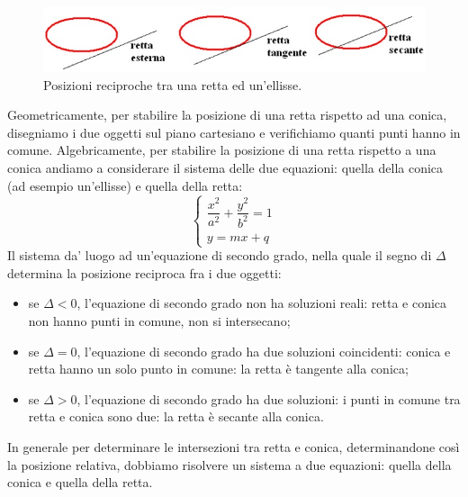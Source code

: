 \begin{figure}[htbp]
  \centering
  \includegraphics[width=\textwidth]{img/rettaconica.jpg}
  \caption{Posizioni reciproche tra una retta ed un'ellisse.}%
\end{figure}
Geometricamente, per stabilire la posizione di una retta rispetto ad una 
conica, disegniamo i due oggetti sul piano cartesiano e verifichiamo quanti 
punti hanno in comune. Algebricamente, per stabilire la posizione di una 
retta rispetto a una conica andiamo a considerare il sistema delle due 
equazioni: quella della conica (ad esempio un'ellisse) e quella della 
retta:
\[\begin{cases}  \dfrac{x^{2}}{a^{2}}+\dfrac{y^{2}}{b^{2}}=1   \\ y=mx+q  
\end{cases}\]
Il sistema da' luogo ad un'equazione di secondo grado, nella quale il 
segno di $\Delta$ determina la posizione reciproca fra i due oggetti:

\begin{itemize} [noitemsep]
  \item se $\Delta<0$, l'equazione di secondo grado non ha soluzioni 
reali: retta e conica non hanno punti in comune, non si intersecano;
  \item se $\Delta=0$, l'equazione di secondo grado ha due soluzioni coincidenti: conica e retta hanno un solo 
punto in comune: la retta è tangente alla conica;
  \item se $\Delta>0$, l'equazione di secondo grado ha due soluzioni:
  i punti in comune tra retta e conica sono due: la retta è 
secante alla conica.
\end{itemize}

In generale per determinare le intersezioni tra retta e conica, 
determinandone così la posizione relativa, 
dobbiamo risolvere un sistema a due equazioni: quella della conica e quella 
della retta. 

